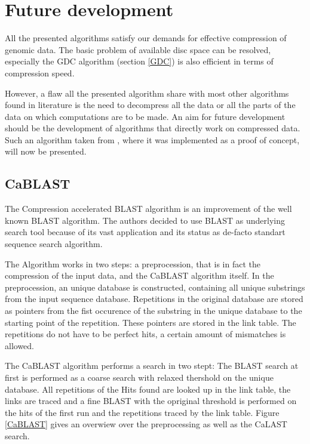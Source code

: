 \documentclass[acmtocl,acmnow]{article}
\begin{document}
\section{Future development}

All the presented algorithms satisfy our demands for effective compression of genomic data. The basic problem of available
disc space can be resolved, especially the GDC algorithm (section \ref{GDC}) is also efficient in terms of  compression
speed.

However, a flaw all the presented algorithm share with most other algorithms found in literature is the need to decompress
all the data or all the parts of the data on which computations are to be made. An aim for future development should
be the development of algorithms that directly work on compressed data. Such an algorithm taken from \cite{LohBamBer}, where
it was implemented as a proof of concept, will now be presented.

\subsection{CaBLAST}

The Compression accelerated BLAST algorithm is an improvement of the well known BLAST algorithm. The authors decided to
use BLAST as underlying search tool because of its vast application and its status as de-facto standart sequence search
algorithm.

The Algorithm works in two steps: a preprocession, that is in fact the compression of the input data, and the CaBLAST
algorithm itself. In the preprocession, an unique database is constructed, containing all unique substrings from the 
input sequence database. Repetitions in the original database are stored as pointers from the fist occurence of the
substring in the unique database to the starting point of the repetition. These pointers are stored in the link table.
The repetitions do not have to be perfect hits, a certain amount of mismatches is allowed.

The CaBLAST algorithm performs a search in two stept: The BLAST search at first is performed as a coarse search with
relaxed thershold on the unique database. All repetitions of the Hits found are looked up in the link table, the links 
are traced and a fine BLAST with the opriginal threshold is performed on the hits of the first run and the repetitions 
traced by the link table.
Figure \ref{CaBLAST} gives an overwiew over the preprocessing as well as the CaLAST search.
\end{document}
